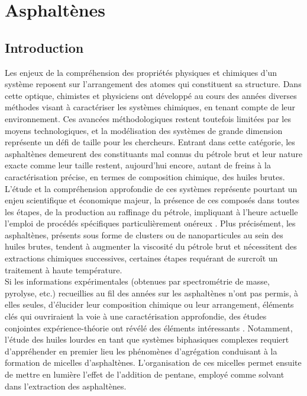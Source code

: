 \chapter{Asphaltènes}
\minitoc
\restoregeometry

\newpage	
	\section*{Introduction}
	
	Les enjeux de la compréhension des propriétés physiques et chimiques d'un système reposent sur l'arrangement des atomes qui constituent sa structure. Dans cette optique, chimistes et physiciens ont développé au cours des années diverses méthodes visant à caractériser les systèmes chimiques, en tenant compte de leur environnement. Ces avancées méthodologiques restent toutefois limitées par les moyens technologiques, et la modélisation des systèmes de grande dimension représente un défi de taille pour les chercheurs. Entrant dans cette catégorie, les asphaltènes demeurent des constituants mal connus du pétrole brut et leur nature exacte comme leur taille restent, aujourd'hui encore, autant de freins à la caractérisation précise, en termes de composition chimique, des huiles brutes. L'étude et la compréhension approfondie de ces systèmes représente pourtant un enjeu scientifique et économique majeur, la présence de ces composés dans toutes les étapes, de la production au raffinage du pétrole, impliquant à l'heure actuelle l'emploi de procédés spécifiques particulièrement onéreux \cite{akbarzadeh2007asphaltenes}. Plus précisément, les asphaltènes, présents sous forme de clusters ou de nanoparticules au sein des huiles brutes, tendent à augmenter la viscosité du pétrole brut et nécessitent des extractions chimiques successives, certaines étapes requérant de surcroît un traitement à haute température. \\
	
	Si les informations expérimentales (obtenues par spectrométrie de masse, pyrolyse, etc.) recueillies au fil des années sur les asphaltènes n'ont pas permis, à elles seules, d'élucider leur composition chimique ou leur arrangement, éléments clés qui ouvriraient la voie à une caractérisation approfondie, des études conjointes expérience-théorie ont révélé des éléments intéressants \cite{neurock1994molecular}. Notamment, l'étude des huiles lourdes en tant que systèmes biphasiques complexes requiert d'appréhender en premier lieu les phénomènes d'agrégation conduisant à la formation de micelles d'asphaltènes. L'organisation de ces micelles permet ensuite de mettre en lumière l'effet de l'addition de pentane, employé comme solvant dans l'extraction des asphaltènes.   \\
	
